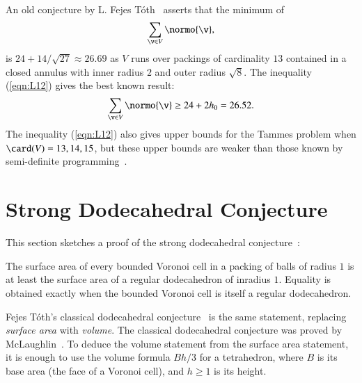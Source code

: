 \documentclass{llncs}
\begin{document}
\begin{remark}
An old conjecture by L. Fejes
T\'oth~\cite[p.~178]{Toth:1972:Lagerungen} asserts that the minimum of
\begin{equation}\label{eqn:FT}
\sum_{\v\in V} \normo{\v},
\end{equation}
is $24+ 14/\sqrt{27}\approx 26.69$
as $V$ runs over packings of cardinality $13$ contained in a closed
annulus with inner radius $2$ and outer radius $\sqrt8$.  The
inequality (\ref{eqn:L12}) gives the best known result:
\begin{equation}
\sum_{\v\in V} \normo{\v}\ge 24 + 2 h_0 = 26.52.
\end{equation}
The inequality (\ref{eqn:L12}) also gives upper bounds for the Tammes
problem when $\card(V)=13,14,15$, but these upper bounds are weaker
than those known by semi-definite programming~\cite{BV08}.
\end{remark}

\section{Strong Dodecahedral Conjecture}

This section sketches a proof of the strong dodecahedral
conjecture~\cite{Bezdek00}:

\begin{theorem}
  The surface area of every bounded Voronoi cell in a packing of balls
  of radius $1$ is at least the surface area of a regular dodecahedron
  of inradius $1$.  Equality is obtained exactly when the bounded
  Voronoi cell is itself a regular dodecahedron.
\end{theorem}

\begin{remark} Fejes T\'oth's classical dodecahedral
  conjecture~\cite{Toth:1943:MZ} is the same statement, replacing {\it
    surface area} with {\it volume}.  The classical dodecahedral
  conjecture was proved by McLaughlin~\cite{Hales:2010:Dodec}.  To
  deduce the volume statement from the surface area statement, it is
  enough to use the volume formula $B h/3$ for a tetrahedron, where
  $B$ is its base area (the face of a Voronoi cell), and $h\ge 1$ is
  its height.
\end{remark}
\end{document}
